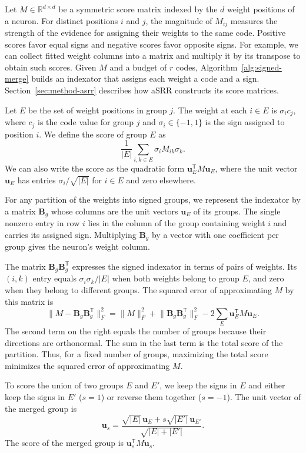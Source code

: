 Let $M\in\mathbb R^{d\times d}$ be a symmetric score matrix indexed by
the $d$ weight positions of a neuron. For distinct positions $i$ and $j$,
the magnitude of $M_{ij}$ measures the strength of the evidence for
assigning their weights to the same code. Positive scores favor equal
signs and negative scores favor opposite signs. For example, we can
collect fitted weight columns into a matrix and multiply it by its
transpose to obtain such scores. Given $M$ and a budget of $r$ codes,
Algorithm~\ref{alg:signed-merge} builds an indexator that assigns each
weight a code and a sign. Section~\ref{sec:method-asrr} describes how
aSRR constructs its score matrices.

Let $E$ be the set of weight positions in group $j$. The weight at
each $i\in E$ is $\sigma_i c_j$, where $c_j$ is the code value for
group $j$ and $\sigma_i\in\{-1,1\}$ is the sign assigned to position
$i$. We define the score of group $E$ as
\[
    \frac{1}{|E|}\sum_{i,k\in E}\sigma_i M_{ik}\sigma_k.
\]
We can also write the score as the quadratic form
$\mathbf u_E^{\mathsf T}M\mathbf u_E$, where the unit vector
$\mathbf u_E$ has entries $\sigma_i/\sqrt{|E|}$ for $i\in E$ and zero
elsewhere.

For any partition of the weights into signed groups, we represent the
indexator by a matrix $\mathbf B_g$ whose columns are the unit vectors
$\mathbf u_E$ of its groups. The single nonzero entry in row $i$ lies
in the column of the group containing weight $i$ and carries its
assigned sign. Multiplying $\mathbf B_g$ by a vector with one coefficient
per group gives the neuron's weight column.

The matrix $\mathbf B_g\mathbf B_g^{\mathsf T}$ expresses the signed
indexator in terms of pairs of weights. Its $(i,k)$ entry equals
$\sigma_i\sigma_k/|E|$ when both weights belong to group $E$, and zero
when they belong to different groups. The squared error of approximating
$M$ by this matrix is
\[
    \lVert M-\mathbf B_g\mathbf B_g^{\mathsf T}\rVert_F^2
        =\lVert M\rVert_F^2+\lVert\mathbf B_g\mathbf B_g^{\mathsf T}\rVert_F^2
        -2\sum_E\mathbf u_E^{\mathsf T}M\mathbf u_E.
\]
The second term on the right equals the number of groups because
their directions are orthonormal. The sum in the last term is the
total score of the partition. Thus, for a fixed number of groups,
maximizing the total score minimizes the squared error of approximating $M$.

To score the union of two groups $E$ and $E'$, we keep the signs in
$E$ and either keep the signs in $E'$ ($s=1$) or reverse them together
($s=-1$). The unit vector of the merged group is
\[
    \mathbf u_s=
        \frac{\sqrt{|E|}\,\mathbf u_E+s\sqrt{|E'|}\,\mathbf u_{E'}}
        {\sqrt{|E|+|E'|}}.
\]
The score of the merged group is $\mathbf u_s^{\mathsf T}M\mathbf u_s$.

